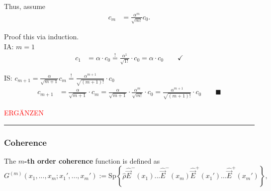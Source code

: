 \documentclass{article}
\newcommand{\lrschweif}[1]{\left\{#1\right\}}
\begin{document}
{	Thus, assume
		\begin{align*}
			c_m &= \frac{\alpha^m}{\sqrt{m!}}c_0.
		\end{align*}
	
	Proof this via induction.\\
	IA: $m=1$
		\begin{align*}
			c_1 &= \alpha \cdot c_0 \stackrel{!}{=} \frac{\alpha^1}{\sqrt{1!}} \cdot c_0 = \alpha \cdot c_0 \qquad \checkmark
		\end{align*}
	
	IS: $c_{m+1} = \frac{\alpha}{\sqrt{m+1}} c_m \stackrel{!}{=} \frac{\alpha^{m+1}}{\sqrt{(m+1)!}} \cdot c_0$	
		\begin{align*}
			c_{m+1} &= \frac{\alpha}{\sqrt{m+1}} \cdot c_m = \frac{\alpha}{\sqrt{m+1}} \cdot \frac{\alpha^m}{\sqrt{m!}} \cdot c_0 = \frac{\alpha^{m+1}}{\sqrt{(m+1)!}} \cdot c_0 \qquad \blacksquare
		\end{align*}

	\textcolor{red}{ERGÄNZEN}
\hrule
}


\newpage


\subsubsection{Coherence}
The \textbf{$m$-th order coherence} function is defined as
	\begin{equation}
		G^{(m)}(x_1, ..., x_m; x_1', ..., x_m') := \text{Sp} \lrschweif{ \hat{\rho} \hat{\vec{E}}^-(x_1) ... \hat{\vec{E}}^-(x_m) \hat{\vec{E}}^+(x_1') ... \hat{\vec{E}}^+(x_m') },
	\end{equation}
\end{document}
